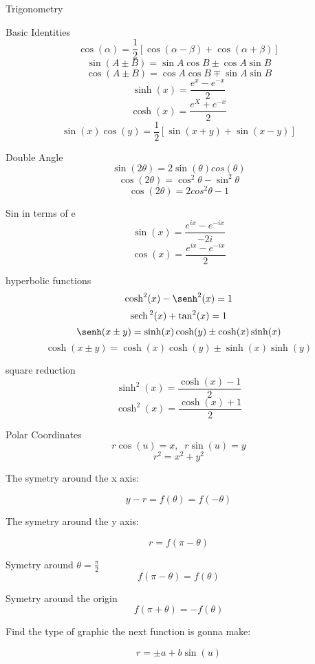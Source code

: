 \newpage
\begin{section}{Trigonometry}
	\begin{subsection}{Basic Identities}
		$$ \cos (\alpha) = \frac{1}{2} [\cos (\alpha - \beta) + \cos (\alpha + \beta) ] $$
		$$\sin (A \pm B) = \sin A \cos B \pm \cos A \sin B$$
		$$\cos (A \pm B) = \cos A \cos B \mp \sin A \sin B $$
		$$\sinh (x) = \frac{e^x - e ^ {-x} } {2}$$
		$$\cosh (x) = \frac{e^{X} + e^{-x} } {2} $$
		$$\sin (x) \cos (y) = \frac{1}{2}[\sin (x+y) + \sin (x-y) ] $$
	
	\end{subsection}
	\begin{subsection}{Double Angle}
		$$\sin(2 \theta) = 2 \sin ( \theta ) cos (\theta) $$
		$$\cos(2 \theta) = \cos^2 \theta - \sin^2 \theta $$
		$$\cos(2 \theta) = 2 cos^2 \theta - 1 $$
		
	
	\end{subsection}
	\begin{subsection}{Sin in terms of e}
		$$\sin (x) = \frac{e^{ix} - e^{-ix} } {-2i}$$
		$$\cos (x) = \frac{e^{ix} - e^{-ix} } {2}$$
	\end{subsection}
	\begin{subsection}{hyperbolic functions}
		$$\cosh^2 (x) - \senh^2 (x) = 1 $$
		$$\mathrm{sech} \,^2 (x) + \tan^2 (x) = 1 $$
		$$\senh (x \pm y ) = \sinh (x) \cosh (y) \pm \cosh (x) \sinh (x)$$
		$$\cosh (x \pm y ) = \cosh (x) \cosh (y) \pm \sinh (x) \sinh (y)$$
		
	\end{subsection}
	\begin{subsection}{square reduction}
		$$\sinh^2 (x) = \frac{\cosh (x) - 1}{2}$$
		$$\cosh^2 (x) = \frac{\cosh (x) + 1}{2}$$
	\end{subsection}
	\begin{subsection}{Polar Coordinates}
		$$r\cos(u) = x , \; \; r \sin (u) = y $$
		$$r^2 = x^2 + y^2 $$ 

		The symetry around the x axis:

		$$y-r = f( \theta ) = f( -\theta ) $$
		
		The symetry around the y axis:

		$$r = f( \pi - \theta ) $$

		Symetry around $\theta = \frac{\pi}{2}$
		$$f(\pi - \theta) = f(\theta) $$

		Symetry around the origin
		$$f(\pi + \theta) = - f(\theta)$$

		Find the type of graphic the next function is gonna make:

		$$r = \pm a + b \sin (u) $$
		

\end{subsection}
\end{section}
